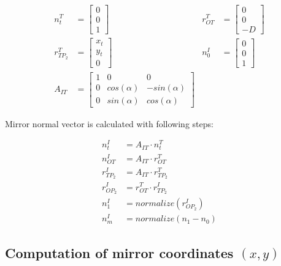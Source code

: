 \begin{align*}
    n^{T}_{t}       & =
    \begin{bmatrix}
        0 \\
        0 \\
        1
    \end{bmatrix} &
    r^{T}_{OT}      & =
    \begin{bmatrix}
        0 \\
        0 \\
        -D
    \end{bmatrix}      \\
    r^{T}_{TP_{2}}  & =
    \begin{bmatrix}
        x_{t} \\
        y_{t} \\
        0
    \end{bmatrix} &
    n^{I}_{0}       & =
    \begin{bmatrix}
        0 \\
        0 \\
        1
    \end{bmatrix}      \\
    A_{IT}          & =
    \begin{bmatrix}
        1 & 0           & 0            \\
        0 & cos(\alpha) & -sin(\alpha) \\
        0 & sin(\alpha) & cos(\alpha)
    \end{bmatrix}
\end{align*}


Mirror normal vector is calculated with following steps:

\begin{align*}
    n^{I}_{t}      & = A_{IT} \cdot n^{T}_{t}          \\
    n^{I}_{OT}     & = A_{IT} \cdot r^{T}_{OT}         \\
    r^{I}_{TP_{2}} & = A_{IT} \cdot r^{T}_{TP_{2}}     \\
    r^{I}_{OP_{2}} & = r^{T}_{OT} \cdot r^{I}_{TP_{2}} \\
    n^{I}_{1}      & = normalize(r^{I}_{OP_{2}})       \\
    n^{I}_{m}      & = normalize(n_{1} - n_{0})
\end{align*}

\subsection{Computation of mirror coordinates $(x, y)$ }
\label{subsec:compute_mirror_coordinates}


